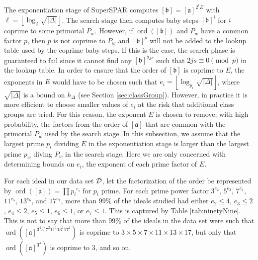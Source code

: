 \documentclass{ucalgthes1}
\theoremstyle{definition}
\DeclareMathOperator{\ord}{ord}
\newcommand{\floor}[1]{\left\lfloor #1 \right\rfloor}
\newcommand{\ideal}{\mathfrak}
\newcommand{\idealclass}[1]{\left[ \ideal #1 \right]}
\newcommand{\aclass}{\idealclass a}
\newcommand{\bclass}{\idealclass b}
\newcommand{\hdelta}{\sqrt{|\Delta|}}
\begin{document}
The exponentiation stage of SuperSPAR computes $\bclass = \aclass ^{2^\ell E}$ with $\ell = \floor{\log_2 \hdelta}$.  The search stage then computes baby steps $\bclass^i$ for $i$ coprime to some primorial $P_w$.  However, if $\ord(\bclass)$ and $P_w$ have a common factor $p$, then $p$ is not coprime to $P_w$ and $\bclass^p$ will not be added to the lookup table used by the coprime baby steps.  If this is the case, the search phase is guaranteed to fail since it cannot find any $\bclass^{2js}$ such that $2js \equiv 0 \pmod p$ in the lookup table.  In order to ensure that the order of $\bclass$ is coprime to $E$, the exponents in $E$ would have to be chosen such that $e_i = \floor{\log_{p_i} \hdelta}$, where $\hdelta$ is a bound on $h_\Delta$ (see Section \ref{sec:classGroup}).  However, in practice it is more efficient to choose smaller values of $e_i$ at the risk that additional class groups are tried.  For this reason, the exponent $E$ is chosen to remove, with high probability, the factors from the order of $\aclass$ that are common with the primorial $P_w$ used by the search stage.  In this subsection, we assume that the largest prime $p_t$ dividing $E$ in the exponentiation stage is larger than the largest prime $p_w$ diving $P_w$ in the search stage.  Here we are only concerned with determining bounds on $e_i$, the exponent of each prime factor of $E$.

For each ideal in our data set $\mathcal D$, let the factorization of the order be represented by $\ord(\aclass) = \prod {p_i}^{e_i}$ for $p_i$ prime.  For each prime power factor $3^{e_2}$, $5^{e_3}$, $7^{e_4}$, $11^{e_5}$, $13^{e_6}$, and $17^{e_7}$, more than 99\% of the ideals studied had either $e_2 \le 4$, $e_3 \le 2$, $e_4 \le 2$, $e_5 \le 1$, $e_6 \le 1$, or $e_7 \le 1$.  This is captured by Table \ref{tab:ninetyNine}.  This is not to say that more than 99\% of the ideals in the data set were such that $\ord(\aclass^{3^4 5^2 7^2 11^1 13^1 17^1})$ is coprime to $3 \times 5 \times 7 \times 11 \times 13 \times 17$, but only that $\ord(\aclass^{3^4})$ is coprime to 3, and so on. 
\end{document}
